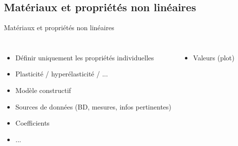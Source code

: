 \subsection{Matériaux et propriétés non linéaires}
\label{sec:Matériaux et propriétés non linéaires}

\begin{frame}[c]{Matériaux et propriétés non linéaires}
  \begin{columns}
    \begin{itemize}
        \item Définir uniquement les propriétés individuelles
        \item Plasticité / hyperélasticité / ...
        \item Modèle constructif
        \item Sources de données (BD, mesures, infos pertinentes)
        \item Coefficients
        \item ...
    \end{itemize}
    \begin{itemize}
        \item Valeurs (plot)
    \end{itemize}
  \end{columns}
\end{frame}